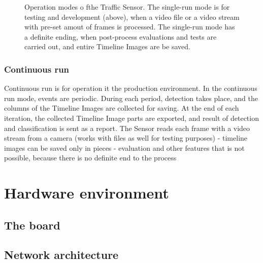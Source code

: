 \begin{figure}[!h]
	\centering
	
	\caption{Operation modes o fthe Traffic Sensor. The single-run mode is for testing and development (above), when a video file or a video stream with pre-set amout of frames is processed. The single-run mode has a definite ending, when post-process evaluations and tests are carried out, and entire Timeline Images are be saved. \label{fig:run_types}}
\end{figure}
\subsubsection{Continuous run}
Continuous run is for operation it the production environment.
In the continuous run mode, events are periodic. 
During each period, detection takes place, and the columns of the Timeline Images are collected for saving.
At the end of each iteration, the collected Timeline Image parts are exported, and result of detection and classification is sent as a report.
The Sensor reads each frame with a video stream from a camera (works with files as well for testing purposes)
- timeline images can be saved only in pieces
- evaluation and other features that is not possible, because there is no definite end to the process
\section{Hardware environment}

\subsection{The board}

\subsection{Network architecture}



